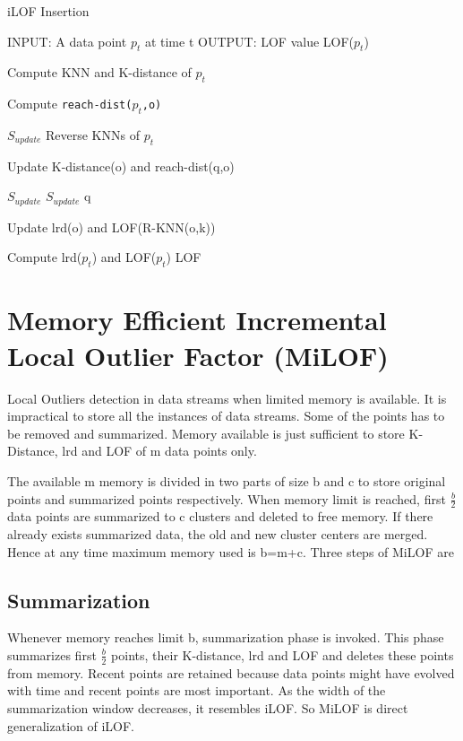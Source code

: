 \begin{algorithm}[h!]
	\caption{iLOF Insertion}
	\begin{algorithmic}
		\STATE  
		\STATE INPUT:  A data point $p_t$ at time t
		\STATE OUTPUT: LOF value LOF($p_t$)
		\STATE
		
		\STATE Compute KNN and K-distance of $p_t$
		
		
		\STATE Compute \texttt{reach-dist($p_t$,o)}
		
		\ENDFOR
		
		\STATE  $S_{update}$ \leftarrow Reverse KNNs of $p_t$
		
		
		\STATE Update K-distance(o) and reach-dist(q,o)
		
		
		\STATE $S_{update}$ \leftarrow  $S_{update}$ \cup q
		\ENDIF
		
		\ENDFOR
		
		
		\STATE Update lrd(o) and LOF(R-KNN(o,k))
		
		\ENDFOR
		\STATE Compute lrd($p_t$) and LOF($p_t$)
		\RETURN LOF
		
		
	\end{algorithmic}
\end{algorithm}


\section{Memory Efficient Incremental Local Outlier Factor (MiLOF)}

Local Outliers detection in data streams when limited memory is available. It is impractical to store all the instances of data streams. Some of the points has to be removed and summarized. Memory available is just sufficient to store K-Distance, lrd and LOF of m data points only.

The available m memory is divided in two parts of size b and c to store original points and summarized points respectively. When memory limit is reached, first ${\frac{b}{2}}$  data points are summarized to c clusters and deleted to free memory. If there already exists summarized data, the old and new cluster centers are merged. Hence at any time maximum memory used is b=m+c.
 Three steps of MiLOF are 

\subsection{Summarization}
Whenever memory reaches limit b, summarization phase is invoked. This phase summarizes first ${\frac{b}{2}}$ points, their K-distance, lrd and LOF and deletes these points from memory. Recent points are retained because data points might have evolved with time and recent points are most important. As the width of the summarization window decreases, it resembles iLOF. So MiLOF is direct generalization of iLOF.


